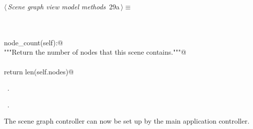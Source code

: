 \documentclass[
    a4paper,      %
    10pt,         %
    openright,    %
    notitlepage,  %
    parskip=half, %
]{scrreprt}       %
\theoremstyle{definition}                    %
\begin{document}
\begin{flushleft} \small
\begin{minipage}{\linewidth}\label{scrap29}\raggedright\small
{} $\langle\,${\itshape Scene graph view model methods}\nobreak\ {\footnotesize {29a}}$\,\rangle\equiv$
\vspace{-1exm}
\begin{list}{}{} \item
\mbox{}\lstinline@@\\
\mbox{}\lstinline@property@\\
\mbox{}\lstinline@def node_count(self):@\\
\mbox{}\lstinline@    """Return the number of nodes that this scene contains."""@\\
\mbox{}\lstinline@@\\
\mbox{}\lstinline@    return len(self.nodes)@\\
\mbox{}\lstinline@@{\NWsep}
\end{list}
\vspace{-1.5ex}
\footnotesize
\begin{list}{}{\setlength{\itemsep}{-\parsep}\setlength{\itemindent}{-\leftmargin}}
\item \NWtxtMacroDefBy\ .
\item \NWtxtMacroRefIn\ .

\item{}
\end{list}
\end{minipage}\vspace{4ex}
\end{flushleft}

The scene graph controller can now be set up by the main application controller.
\end{document}

